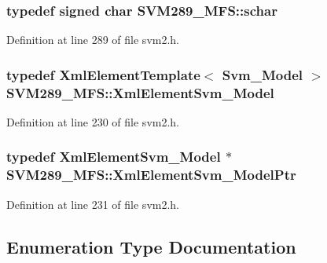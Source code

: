 \subsubsection[{\texorpdfstring{schar}{schar}}]{\setlength{\rightskip}{0pt plus 5cm}typedef signed char {\bf S\+V\+M289\+\_\+\+M\+F\+S\+::schar}}\hypertarget{namespace_s_v_m289___m_f_s_a27545e8471784d831870feacd3e831ff}{}\label{namespace_s_v_m289___m_f_s_a27545e8471784d831870feacd3e831ff}


Definition at line 289 of file svm2.\+h.

\subsubsection[{\texorpdfstring{Xml\+Element\+Svm\+\_\+\+Model}{XmlElementSvm_Model}}]{\setlength{\rightskip}{0pt plus 5cm}typedef {\bf Xml\+Element\+Template}$<$ {\bf Svm\+\_\+\+Model} $>$ {\bf S\+V\+M289\+\_\+\+M\+F\+S\+::\+Xml\+Element\+Svm\+\_\+\+Model}}\hypertarget{namespace_s_v_m289___m_f_s_a4d0f861b3add61d2800b4dfbc4150186}{}\label{namespace_s_v_m289___m_f_s_a4d0f861b3add61d2800b4dfbc4150186}


Definition at line 230 of file svm2.\+h.

\subsubsection[{\texorpdfstring{Xml\+Element\+Svm\+\_\+\+Model\+Ptr}{XmlElementSvm_ModelPtr}}]{\setlength{\rightskip}{0pt plus 5cm}typedef {\bf Xml\+Element\+Svm\+\_\+\+Model} $\ast$ {\bf S\+V\+M289\+\_\+\+M\+F\+S\+::\+Xml\+Element\+Svm\+\_\+\+Model\+Ptr}}\hypertarget{namespace_s_v_m289___m_f_s_ae91ce5ddb69b689aabd2a9b356603b49}{}\label{namespace_s_v_m289___m_f_s_ae91ce5ddb69b689aabd2a9b356603b49}


Definition at line 231 of file svm2.\+h.



\subsection{Enumeration Type Documentation}
